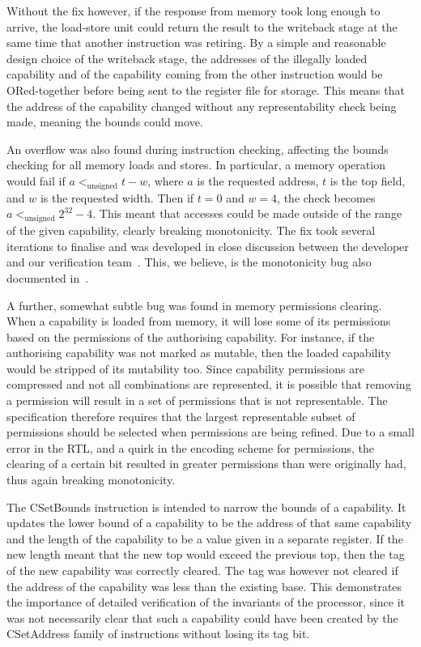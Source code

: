 \documentclass[10pt,conference]{IEEEtran}
\begin{document}
Without the fix however, if the response from memory took long
enough to arrive, the load-store unit could return the result to the writeback
stage at the same time that another instruction was retiring. By a simple
and reasonable design choice of the writeback stage, the addresses of the
illegally loaded capability and of the capability coming from the other
instruction would be ORed-together before being sent to the register file for
storage. This means that the address of the capability changed without any
representability check being made, meaning the bounds could move.

An overflow was also found during instruction checking, affecting the bounds
checking for all memory loads and stores. In particular, a memory operation
would fail if $a <_\mathrm{unsigned} t - w$, where $a$ is the requested
address, $t$ is the top field, and $w$ is the requested width.  Then if $t
= 0$ and $w = 4$, the check becomes $a <_\mathrm{unsigned} 2^{32} - 4$.  This
meant that accesses could be made outside of the range of the given
capability, clearly breaking monotonicity. The fix took several iterations to
finalise and was developed in close discussion between the developer and our
verification team~\cite{issue12}. This, we believe, is the monotonicity bug also
documented in~\cite{vericheri2024}.

A further, somewhat subtle bug was found in memory permissions clearing. When a
capability is loaded from memory, it will lose some of its permissions
based on the permissions of the authorising capability. For instance, if
the authorising capability was not marked as mutable, then the loaded
capability would be stripped of its mutability too. Since capability
permissions are compressed and not all combinations are represented, it is
possible that removing a permission will result in a set of permissions
that is not representable. The specification therefore requires that the
largest representable subset of permissions should be selected when
permissions are being refined. Due to a small error in the RTL, and a quirk
in the encoding scheme for permissions, the clearing of a certain bit
resulted in greater permissions than were originally had, thus again
breaking monotonicity.

The CSetBounds instruction is intended to narrow the bounds of a
capability.  It updates the lower bound of a capability to be the address
of that same capability and the length of the capability to be a value
given in a separate register. If the new length
meant that the new top would exceed the previous top, then the tag
of the new capability was correctly cleared.  The tag was however not
cleared if the address of the capability was less than the existing base.
This demonstrates the
importance of detailed verification of the invariants of the processor,
since it was not necessarily clear that such a capability could have been
created by the CSetAddress family of instructions without losing its tag
bit.
\end{document}
